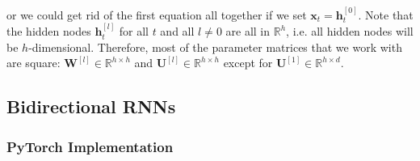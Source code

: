 \documentclass{article}
\begin{document}
      or we could get rid of the first equation all together if we set $\mathbf{x}_t = \mathbf{h}_t^{[0]}$. Note that the hidden nodes $\mathbf{h}^{[l]}_t$ for all $t$ and all $l \neq 0$ are all in $\mathbb{R}^h$, i.e. all hidden nodes will be $h$-dimensional. Therefore, most of the parameter matrices that we work with are square: $\mathbf{W}^{[l]} \in \mathbb{R}^{h \times h}$ and $\mathbf{U}^{[l]} \in \mathbb{R}^{h \times h}$ except for $\mathbf{U}^{[1]} \in \mathbb{R}^{h \times d}$. 

  \subsection{Bidirectional RNNs}

    \subsubsection{PyTorch Implementation}
\end{document}
